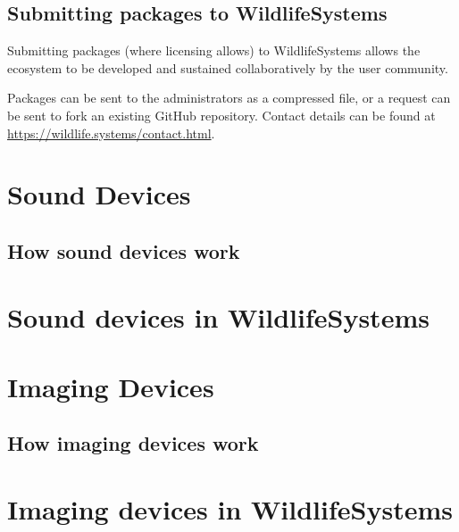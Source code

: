 \documentclass[
]{book}
\begin{document}
\hypertarget{submitting-packages-to-wildlifesystems}{%
\section{Submitting packages to WildlifeSystems}\label{submitting-packages-to-wildlifesystems}}

Submitting packages (where licensing allows) to WildlifeSystems allows the ecosystem to be developed and sustained collaboratively by the user community.

Packages can be sent to the administrators as a compressed file, or a request can be sent to fork an existing GitHub repository. Contact details can be found at \url{https://wildlife.systems/contact.html}.

\hypertarget{sound-devices}{%
\chapter{Sound Devices}\label{sound-devices}}

\hypertarget{how-sound-devices-work}{%
\section{How sound devices work}\label{how-sound-devices-work}}

\hypertarget{sound-devices-in-wildlifesystems}{%
\chapter{Sound devices in WildlifeSystems}\label{sound-devices-in-wildlifesystems}}

\hypertarget{imaging-devices}{%
\chapter{Imaging Devices}\label{imaging-devices}}

\hypertarget{how-imaging-devices-work}{%
\section{How imaging devices work}\label{how-imaging-devices-work}}

\hypertarget{imaging-devices-in-wildlifesystems}{%
\chapter{Imaging devices in WildlifeSystems}\label{imaging-devices-in-wildlifesystems}}
\end{document}
